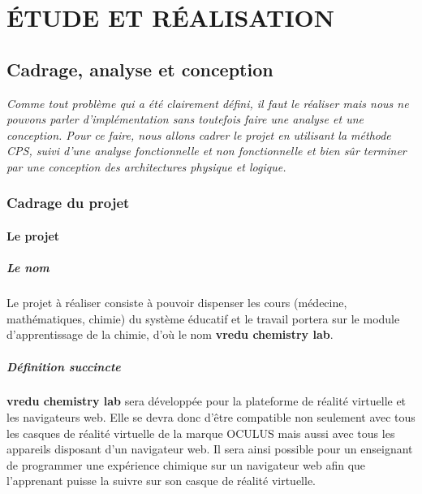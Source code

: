 \part{ÉTUDE ET RÉALISATION}

\chapter{Cadrage, analyse et conception}

\textit{Comme tout problème qui a été clairement défini, il faut le réaliser mais nous ne pouvons
	parler d’implémentation sans toutefois faire une analyse et une conception. Pour ce faire,
	nous allons cadrer le projet en utilisant la méthode CPS, suivi d’une analyse
	fonctionnelle et non fonctionnelle et bien sûr terminer par une conception des architectures
	physique et logique.}

\clearpage

\section{Cadrage du projet}

\subsection{Le projet}

\subsubsection{Le nom}

Le projet à réaliser consiste à pouvoir dispenser les cours (médecine, mathématiques, chimie)
du système éducatif et le travail portera sur le module d’apprentissage de la chimie, d’où le
nom \textbf{vredu chemistry lab}.

\subsubsection{Définition succincte}

\textbf{vredu chemistry lab} sera développée pour la plateforme de réalité virtuelle et les navigateurs web. Elle se devra donc d’être compatible non seulement avec tous les casques de réalité virtuelle de la marque OCULUS mais aussi avec tous les appareils disposant d’un navigateur web. Il sera ainsi possible pour un enseignant de programmer une expérience chimique sur un navigateur web afin que l'apprenant puisse la suivre sur son casque de réalité virtuelle.

